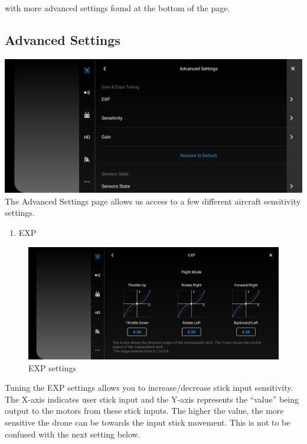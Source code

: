 \documentclass[
]{book}
\providecommand{\tightlist}{%
  \setlength{\itemsep}{0pt}\setlength{\parskip}{0pt}}
\begin{document}
with more advanced settings found at the bottom of the page.

\hypertarget{advanced-settings}{%
\subsection{Advanced Settings}\label{advanced-settings}}

\includegraphics{images/MC/DJI-MC-Advanced-Settings.jpg}
The Advanced Settings page allows us access to a few different aircraft sensitivity settings.

\begin{enumerate}
\def\labelenumi{\arabic{enumi}.}
\tightlist
\item
  EXP
\end{enumerate}

\begin{figure}
\centering
\includegraphics{images/MC/DJI-ExpSettings.jpg}
\caption{EXP settings}
\end{figure}

Tuning the EXP settings allows you to increase/decrease stick input sensitivity. The X-axis indicates user stick input and the Y-axis represents the ``value'' being output to the motors from these stick inputs. The higher the value, the more sensitive the drone can be towards the input stick movement. This is not to be confused with the next setting below.
\end{document}
